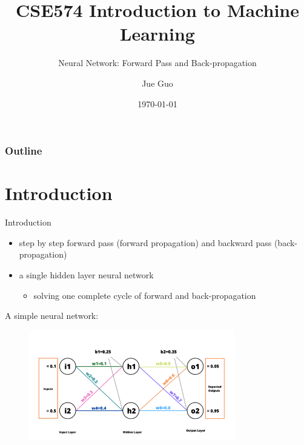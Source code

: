 \documentclass[8pt,dvipsnames]{beamer}
\title{CSE574 Introduction to Machine Learning}
\subtitle{Neural Network: Forward Pass and Back-propagation}
\author{Jue Guo}
\institute{University at Buffalo}
\date{\today}
\begin{document}
\begin{frame}
    \titlepage
\end{frame}
\begin{frame}
    \frametitle{Outline}
    \tableofcontents
\end{frame}

\section{Introduction}
\begin{frame}{Introduction}
\begin{itemize}
	\item step by step forward pass (forward propagation) and backward pass (back-propagation)
	\item a single hidden layer neural network 
	\begin{itemize}
		\item solving one complete cycle of forward and back-propagation
	\end{itemize}
\end{itemize}
\end{frame}

\begin{frame}
	A simple neural network: 
	\begin{figure}
		\centering
		\includegraphics[width=0.8\textwidth]{imgs/nn_2.png}
	\end{figure}
\end{frame}
\end{document}
